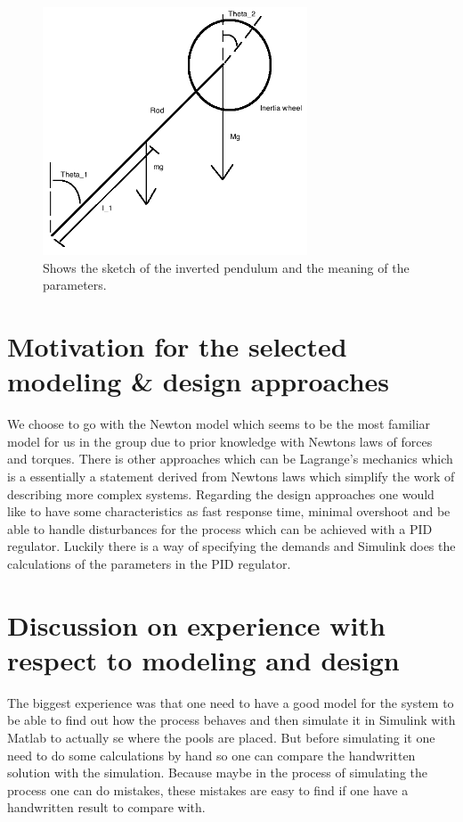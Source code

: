 \documentclass{article}
\begin{document}
\begin{figure}
	\centering
	\includegraphics[width=0.7\textwidth]{Inverted_pedulum_2}
	\caption{Shows the sketch of the inverted pendulum and the meaning of the parameters.}
	\label{fig:sketch_inverted_pendulum}
\end{figure}



\section{Motivation for the selected modeling \& design approaches}

We choose to go with the Newton model which seems to be the most familiar model for us in the group due to prior knowledge with Newtons laws of forces and torques. There is other approaches which can be Lagrange's mechanics which is a essentially a statement derived from Newtons laws which simplify the work of describing more complex systems. Regarding the design approaches one would like to have some characteristics as fast response time, minimal overshoot and be able to handle disturbances for the process which can be achieved with a PID regulator. Luckily there is a way of specifying the demands and Simulink does the calculations of the parameters in the PID regulator. 


\section{Discussion on experience with respect to modeling and design}



The biggest experience was that one need to have a good model for the system to be able to find out how the process behaves and then simulate it in Simulink with Matlab to actually se where the pools are placed. But before simulating it one need to do some calculations by hand so one can compare the handwritten solution with the simulation. Because maybe in the process of simulating the process one can do mistakes, these mistakes are easy to find if one have a handwritten result to compare with.  
\end{document}
